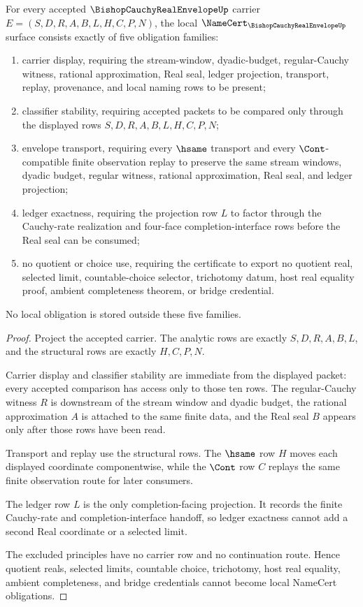 \begin{theorem}
\label{thm:bishop-cauchy-real-envelope-obligation-surface}
For every accepted $\BishopCauchyRealEnvelopeUp$ carrier $E=(S,D,R,A,B,L,H,C,P,N)$, the local $\NameCert_{\BishopCauchyRealEnvelopeUp}$ surface consists exactly of five obligation families:
\begin{enumerate}
\item carrier display, requiring the stream-window, dyadic-budget, regular-Cauchy witness, rational approximation, Real seal, ledger projection, transport, replay, provenance, and local naming rows to be present;
\item classifier stability, requiring accepted packets to be compared only through the displayed rows $S,D,R,A,B,L,H,C,P,N$;
\item envelope transport, requiring every $\hsame$ transport and every $\Cont$-compatible finite observation replay to preserve the same stream windows, dyadic budget, regular witness, rational approximation, Real seal, and ledger projection;
\item ledger exactness, requiring the projection row $L$ to factor through the Cauchy-rate realization and four-face completion-interface rows before the Real seal can be consumed;
\item no quotient or choice use, requiring the certificate to export no quotient real, selected limit, countable-choice selector, trichotomy datum, host real equality proof, ambient completeness theorem, or bridge credential.
\end{enumerate}
No local obligation is stored outside these five families.
\end{theorem}
\begin{proof}
Project the accepted carrier. The analytic rows are exactly $S,D,R,A,B,L$, and the structural rows are exactly $H,C,P,N$.

Carrier display and classifier stability are immediate from the displayed packet: every accepted comparison has access only to those ten rows. The regular-Cauchy witness $R$ is downstream of the stream window and dyadic budget, the rational approximation $A$ is attached to the same finite data, and the Real seal $B$ appears only after those rows have been read.

Transport and replay use the structural rows. The $\hsame$ row $H$ moves each displayed coordinate componentwise, while the $\Cont$ row $C$ replays the same finite observation route for later consumers.

The ledger row $L$ is the only completion-facing projection. It records the finite Cauchy-rate and completion-interface handoff, so ledger exactness cannot add a second Real coordinate or a selected limit.

The excluded principles have no carrier row and no continuation route. Hence quotient reals, selected limits, countable choice, trichotomy, host real equality, ambient completeness, and bridge credentials cannot become local NameCert obligations.
\end{proof}

